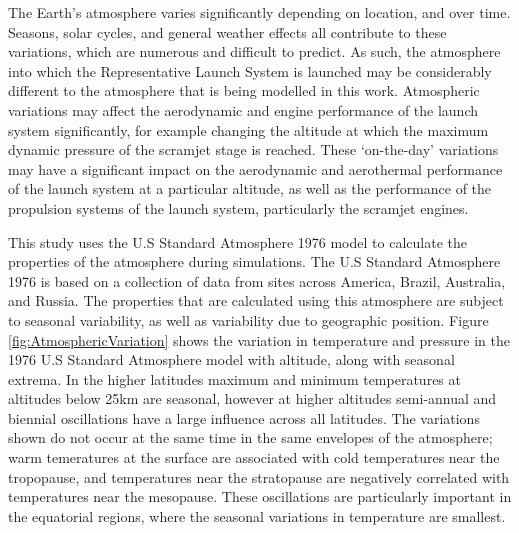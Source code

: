 The Earth's atmosphere varies significantly depending on location, and over time. Seasons, solar cycles, and general weather effects all contribute to these variations, which are numerous and difficult to predict. As such, the atmosphere into which the Representative Launch System is launched may be considerably different to the atmosphere that is being modelled in this work. 
Atmospheric variations may affect the aerodynamic and engine performance of the launch system significantly, for example changing the altitude at which the maximum dynamic pressure of the scramjet stage is reached. These `on-the-day' variations may have a significant impact on the aerodynamic and aerothermal performance of the launch system at a particular altitude, as well as the performance of the propulsion systems of the launch system, particularly the scramjet engines. 

This study uses the U.S Standard Atmosphere 1976 model\cite{Administration1976} to calculate the properties of the atmosphere during simulations. The U.S Standard Atmosphere 1976 is based on a collection of data from sites across America, Brazil, Australia, and Russia\cite{Administration1976}. The properties that are calculated using this atmosphere are subject to seasonal variability, as well as variability due to geographic position. Figure \ref{fig:AtmosphericVariation} shows the variation in temperature and pressure in the 1976 U.S Standard Atmosphere model with altitude, along with seasonal extrema. In the higher latitudes maximum and minimum temperatures at altitudes below 25km are seasonal, however at higher altitudes semi-annual and biennial oscillations have a large influence\cite{Administration1976} across all latitudes. The variations shown do not occur at the same time in the same envelopes of the atmosphere; warm temeratures at the surface are associated with cold temperatures near the tropopause, and temperatures near the stratopause are negatively correlated with temperatures near the mesopause\cite{Administration1976}. These oscillations are particularly important in the equatorial regions, where the seasonal variations in temperature are smallest. 




